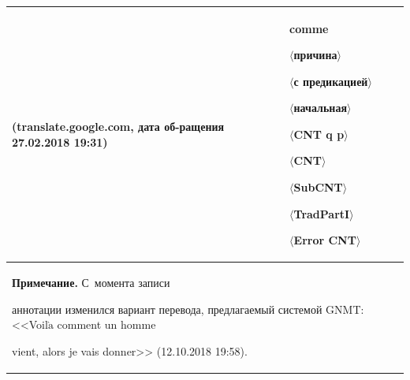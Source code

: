 \begin{table}
\begin{center}
\begin{tabular}{|p{44mm}|p{32mm}|p{45mm}|p{24mm}|}
\newline


(translate.google.com, дата об-\linebreak ра\-ще\-ния 27.02.2018 19:31)&\textbf{comme}\newline 


$\langle$причина$\rangle$\newline


$\langle$с предикацией$\rangle$\newline


$\langle$начальная$\rangle$\newline


$\langle$CNT q p$\rangle$\newline


$\langle$CNT$\rangle$\newline


$\langle$SubCNT$\rangle$\newline


$\langle$TradPartI$\rangle$\newline


$\langle$Error CNT$\rangle$\\


\hline


\multicolumn{4}{p{159mm}}{\footnotesize \hspace*{2mm}\textbf{Примечание.} С~момента записи 


аннотации изменился вариант перевода, предлагаемый системой GNMT: <<Voil$\grave{\mbox{a}}$ comment un homme 


vient, alors je vais donner>> (12.10.2018 19:58).}


\end{tabular}


\end{center}






\begin{center}




\vspace*{2ex}






\end{center}
\end{table}
